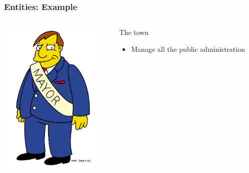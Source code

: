 \documentclass{beamer}
\begin{document}
\begin{frame}
\frametitle{Entities: Example}
\begin{columns}
 \begin{column}{0.45\textwidth}
         \includegraphics[height=7.5cm]{./pics/simpsons/mayor_Joe-Quimby.png}
 \end{column}
 \begin{column}{0.45\textwidth}
    \begin{block}{The town}
        \begin{itemize}
            \item Manage all the public administration
        \end{itemize}

    \end{block}

 \end{column}
\end{columns}
\end{frame}
\end{document}
